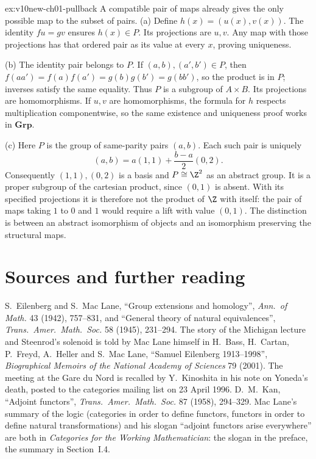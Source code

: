 \begin{solution}{ex:v10new-ch01-pullback}
\idea A compatible pair of maps already gives the only possible map to the subset of pairs.
\writeup (a) Define $h(x)=(u(x),v(x))$. The identity $fu=gv$ ensures $h(x)\in P$. Its projections are $u,v$. Any map with those projections has that ordered pair as its value at every $x$, proving uniqueness.

(b) The identity pair belongs to $P$. If $(a,b),(a',b')\in P$, then $f(aa')=f(a)f(a')=g(b)g(b')=g(bb')$, so the product is in $P$; inverses satisfy the same equality. Thus $P$ is a subgroup of $A\times B$. Its projections are homomorphisms. If $u,v$ are homomorphisms, the formula for $h$ respects multiplication componentwise, so the same existence and uniqueness proof works in $\mathbf{Grp}$.

(c) Here $P$ is the group of same-parity pairs $(a,b)$. Each such pair is uniquely
\[
(a,b)=a(1,1)+\frac{b-a}{2}(0,2).
\]
Consequently $(1,1),(0,2)$ is a basis and $P\cong\Z^2$ as an abstract group. It is a proper subgroup of the cartesian product, since $(0,1)$ is absent. With its specified projections it is therefore not the product of $\Z$ with itself: the pair of maps taking $1$ to $0$ and $1$ would require a lift with value $(0,1)$. The distinction is between an abstract isomorphism of objects and an isomorphism preserving the structural maps.
\end{solution}

\section*{Sources and further reading}

S.~Eilenberg and S.~Mac Lane, ``Group extensions and homology'', \emph{Ann.\ of Math.} 43 (1942), 757--831, and ``General theory of natural equivalences'', \emph{Trans.\ Amer.\ Math.\ Soc.} 58 (1945), 231--294. The story of the
Michigan lecture and Steenrod's solenoid is told by Mac Lane himself in H.~Bass, H.~Cartan, P.~Freyd, A.~Heller and S.~Mac Lane, ``Samuel Eilenberg 1913--1998'', \emph{Biographical Memoirs of the National Academy of
Sciences} 79 (2001). The meeting at the Gare du Nord is recalled by Y.~Kinoshita in his note on Yoneda's death, posted to the categories mailing list on 23 April 1996. D.~M.~Kan, ``Adjoint functors'', \emph{Trans.\ Amer.\ Math.\ Soc.} 87 (1958),
294--329. Mac Lane's summary of the logic (categories in order to define functors, functors in order to define natural transformations) and his
slogan ``adjoint functors arise everywhere'' are both in \emph{Categories for the Working Mathematician}: the slogan in the preface, the summary in Section~I.4.

